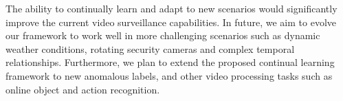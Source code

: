 The ability to continually learn and adapt to new scenarios would significantly improve the current video surveillance capabilities. In future, we aim to evolve our framework to work well in more challenging scenarios such as dynamic weather conditions, rotating security cameras and complex temporal relationships. Furthermore, we plan to extend the proposed continual learning framework to new anomalous labels, and other video processing tasks such as online object and action recognition. 

